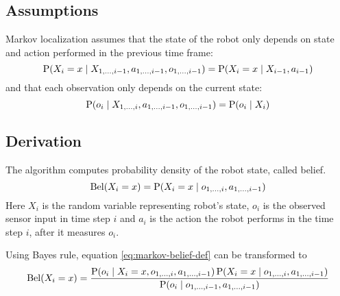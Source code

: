 \subsection{Assumptions}
\label{sec:markov_assumptions}
Markov localization assumes that the state of the robot only depends
on state and action performed in the previous time frame:
	\begin{equation}
		\operatorname{\mathrm{P}}(X_i = x \mid X_{1, \dotsc, i - 1}, a_{1, \dotsc, i - 1},
		o_{1, \dotsc, i - 1}) =
		\operatorname{\mathrm{P}}(X_i = x \mid X_{i - 1}, a_{i - 1})
	\end{equation}
and that each observation only depends on the current state:
	\begin{equation}
		\label{eq:markov-observation-independence}
		\operatorname{\mathrm{P}}(o_i \mid X_{1, \dotsc, i}, a_{1, \dotsc, i - 1},
		o_{1, \dotsc, i - 1}) =
		\operatorname{\mathrm{P}}(o_i \mid X_i)
	\end{equation}


\subsection{Derivation}

The algorithm computes probability density of the robot state, called belief.
\begin{equation}
	\label{eq:markov-belief-def}
	\operatorname{\mathrm{Bel}}(X_i = x) = \operatorname{\mathrm{P}}(X_i = x \mid o_{1, \dotsc, i}, a_{1,\dotsc,i - 1})
\end{equation}
Here \(X_i\) is the random variable representing robot's state,
\(o_i\) is the observed sensor input in time step \(i\) and \(a_i\)
is the action the robot performs in the time step \(i\), after it
measures \(o_i\).

Using Bayes rule, equation \eqref{eq:markov-belief-def} can be transformed to
\begin{equation}
	\label{eq:markov-derivation1}
	\operatorname{\mathrm{Bel}}(X_i = x) =
	\frac{
		\operatorname{\mathrm{P}}(o_i \mid X_i = x, o_{1, \dotsc, i}, a_{1,\dotsc,i - 1})
		\operatorname{\mathrm{P}}(X_i = x \mid o_{1, \dotsc, i}, a_{1, \dotsc, i - 1})
	}{
		\operatorname{\mathrm{P}}(o_i \mid o_{1, \dotsc, i-1}, a_{1, \dotsc, i-1})
	}
\end{equation}

